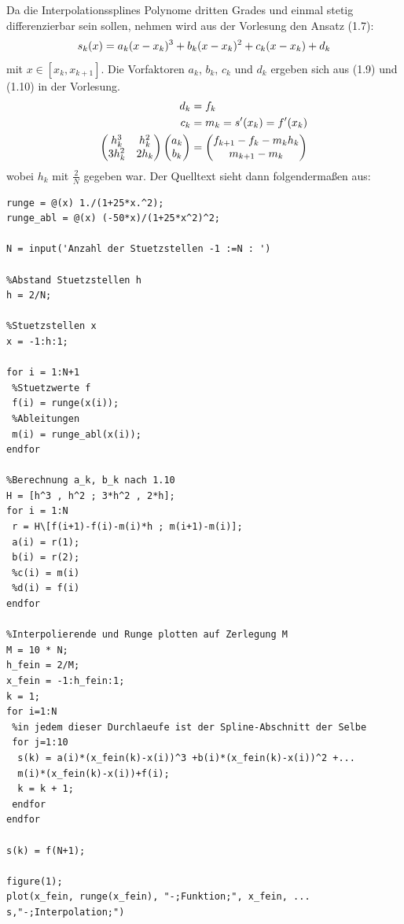 \documentclass[ngerman,a4paper]{texmf/tex/latex/mathscript/mathscript}
\begin{document}
	Da die Interpolationssplines Polynome dritten Grades und einmal stetig differenzierbar sein sollen, nehmen wird aus der Vorlesung den Ansatz (1.7):
	\begin{align}
		s_k(x) = a_k(x-x_k)^3 + b_k(x-x_k)^2 + c_k(x-x_k) + d_k\notag
	\end{align}
	mit $x\in[x_k,x_{k+1}]$. Die Vorfaktoren $a_k$, $b_k$, $c_k$ und $d_k$ ergeben sich aus (1.9) und (1.10) in der Vorlesung.
	\begin{align}
		d_k &= f_k \notag \\
		c_k &= m_k = s'(x_k) = f'(x_k) \notag \\
		\begin{pmatrix}
			h_k^3 & h_k^2 \\ 3h_k^2 & 2h_k
		\end{pmatrix}\begin{pmatrix}
			a_k \\ b_k
		\end{pmatrix} &= \begin{pmatrix}
			f_{k+1} - f_k - m_kh_k \\ m_{k+1} - m_k
		\end{pmatrix}\notag
	\end{align}
	wobei $h_k$ mit $\frac{2}{N}$ gegeben war. Der Quelltext sieht dann folgendermaßen aus:
	\begin{lstlisting}
runge = @(x) 1./(1+25*x.^2);
runge_abl = @(x) (-50*x)/(1+25*x^2)^2;

N = input('Anzahl der Stuetzstellen -1 :=N : ')

%Abstand Stuetzstellen h
h = 2/N;

%Stuetzstellen x
x = -1:h:1;

for i = 1:N+1
 %Stuetzwerte f
 f(i) = runge(x(i));
 %Ableitungen
 m(i) = runge_abl(x(i));
endfor

%Berechnung a_k, b_k nach 1.10
H = [h^3 , h^2 ; 3*h^2 , 2*h];
for i = 1:N
 r = H\[f(i+1)-f(i)-m(i)*h ; m(i+1)-m(i)];
 a(i) = r(1);
 b(i) = r(2);
 %c(i) = m(i)
 %d(i) = f(i)
endfor

%Interpolierende und Runge plotten auf Zerlegung M
M = 10 * N;
h_fein = 2/M;
x_fein = -1:h_fein:1;
k = 1;
for i=1:N
 %in jedem dieser Durchlaeufe ist der Spline-Abschnitt der Selbe
 for j=1:10
  s(k) = a(i)*(x_fein(k)-x(i))^3 +b(i)*(x_fein(k)-x(i))^2 +...
  m(i)*(x_fein(k)-x(i))+f(i);
  k = k + 1;
 endfor
endfor

s(k) = f(N+1);

figure(1);
plot(x_fein, runge(x_fein), "-;Funktion;", x_fein, ...
s,"-;Interpolation;")
	\end{lstlisting}
	
\end{document}

